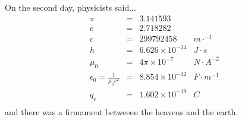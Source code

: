 \documentclass[a4paper,12pt]{article}
\begin{document}

\begin{multicols}{2}
On the second day, physicists said...
\[
\begin{array}{rcll}
\pi &=& 3.141593 &\\
e &=& 2.718282 &\\
c &=& 299 792 458 & m\cdot^{-1}\\
h &=& 6.626 \times 10^{-34} & J\cdot s\\
\mu_0 &=& 4\pi \times 10^{-7}&N\cdot A^{-2}\\
\epsilon_0 = \frac{1}{\mu_0 c^2}&=& 8.854 \times 10^{-12}& F\cdot m^{-1}\\
q_e &=& 1.602 \times 10^{-19} & C\\
\end{array}
\]
and there was a firmament betweeen the heavens and the earth.
\vfill


\end{multicols}
\end{document}
